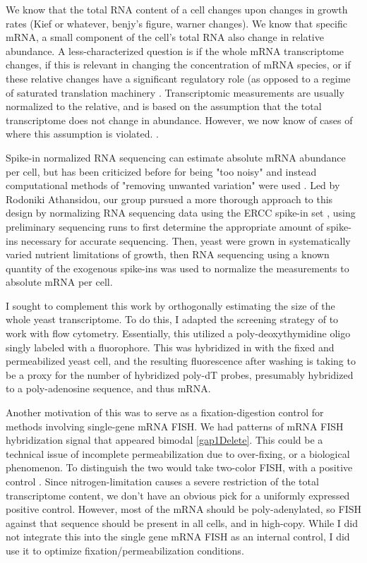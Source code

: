 We know that the total RNA content of a cell changes upon changes in
growth rates (Kief or whatever, benjy's figure, warner changes).
We know that specific mRNA, a small component of the cell's total RNA
also change in relative abundance. A less-characterized question is if
the whole mRNA transcriptome changes, if this is relevant in changing
the concentration of mRNA species, or if these relative changes have a
significant regulatory role (as opposed to a regime of saturated
translation machinery \parencite{shah2013??}.
Transcriptomic measurements are usually normalized to the relative,
and is based on the assumption that the total transcriptome does not
change in abundance.
However, we now know of cases of where this assumption is violated.
\parencite{myc example}.

Spike-in normalized RNA sequencing can estimate absolute mRNA
abundance per cell, but has been criticized before for
being "too noisy" and instead computational methods of "removing
unwanted variation" were used \parencite{}. 
Led by Rodoniki Athansidou, our group pursued a more thorough approach
to this design by normalizing RNA sequencing data using the ERCC
spike-in set \parencite{ERCC group}, using preliminary sequencing runs
to first determine the appropriate amount of spike-ins necessary for
accurate sequencing. Then, yeast were grown in systematically varied
nutrient limitations of growth, then RNA sequencing using a known
quantity of the exogenous spike-ins was used to normalize the
measurements to absolute mRNA per cell.

I sought to complement this work by orthogonally estimating the size 
of the whole yeast transcriptome. To do this, I adapted the screening 
strategy of \cite{amberg1992???} to work with flow cytometry. 
Essentially, this utilized a poly-deoxythymidine oligo singly labeled
with a fluorophore. This was hybridized in with the fixed and
permeabilized yeast cell, and the resulting fluorescence after washing
is taking to be a proxy for the number of hybridized poly-dT probes,
presumably hybridized to a poly-adenosine sequence, and thus mRNA.

Another motivation of this was to serve as a fixation-digestion
control for methods involving single-gene mRNA FISH.
We had patterns of mRNA FISH hybridization signal that appeared
bimodal \autoref{gap1Delete}. 
This could be a technical issue of incomplete permeabilization due to
over-fixing, or a biological phenomenon.
To distinguish the two would take two-color FISH, with a positive
control \parencite{regenbergtwocolor???}.
Since nitrogen-limitation causes a severe restriction of the total
transcriptome content, we don't have an obvious pick for a uniformly
expressed positive control. 
However, most of the mRNA should be poly-adenylated, so FISH against
that sequence should be present in all cells, and in high-copy.
While I did not integrate this into the single gene mRNA FISH as an
internal control, I did use it to optimize fixation/permeabilization 
conditions.

